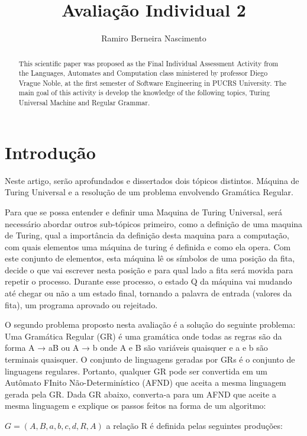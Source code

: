 \documentclass{article}
\title{Avaliação Individual 2}
\author{Ramiro Berneira Nascimento}
\begin{document}
\maketitle

\begin{abstract}
This scientific paper was proposed as the Final Individual Assessment Activity from the Languages, Automates and Computation class ministered by professor Diego Vrague Noble, at the first semester of Software Engineering in PUCRS University. The main goal of this activity is develop the knowledge of the following topics, Turing Universal Machine and Regular Grammar.  
\end{abstract}

\section{Introdução}

    Neste artigo, serão aprofundados e dissertados dois tópicos distintos. Máquina de Turing Universal e a resolução de um problema envolvendo Gramática Regular.  
    
    Para que se possa entender e definir uma Maquina de Turing Universal, será necessário abordar outros sub-tópicos primeiro, como a definição de uma maquina de Turing, qual a importância da definição desta maquina para a computação, com quais elementos uma máquina de turing é definida e como ela opera. Com este conjunto de elementos, esta máquina lê os símbolos de uma posição da fita, decide o que vai escrever nesta posição e para qual lado a fita será movida para repetir o processo. Durante esse processo, o estado Q da máquina vai mudando até chegar ou não a um estado final, tornando a palavra de entrada (valores da fita), um programa aprovado ou rejeitado.
    
    O segundo problema proposto nesta avaliação é a solução do seguinte problema:
    Uma Gramática Regular (GR) é uma gramática onde todas as regras são da forma A → aB ou A → b onde A e B são variáveis quaisquer e a e b são terminais quaisquer. O conjunto de linguagens geradas por GRs é o conjunto de linguagens regulares. Portanto, qualquer GR pode ser convertida em um Autômato FInito Não-Determinístico (AFND) que aceita a  mesma linguagem gerada pela GR. Dada GR abaixo, converta-a para um AFND que aceite a mesma linguagem e explique os passos feitos na forma de um algoritmo:
    
    $G = ({A,B}, {a,b,c,d}, R, A)$ a relação R é definida pelas seguintes produções:
    
\end{document}
